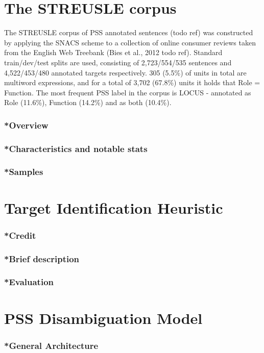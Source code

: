 \section{The STREUSLE corpus}\label{sec:streusle}
The STREUSLE corpus of PSS annotated sentences (todo ref) was constructed by applying the SNACS scheme to a collection of online consumer reviews taken from the English Web Treebank (Bies et al., 2012 todo ref). Standard train/dev/test splits are used, consisting of 2,723/554/535 sentences and 4,522/453/480 annotated targets respectively. 305 (5.5\%) of units in total are multiword expressions, and for a total of 3,702 (67.8\%) units it holds that Role = Function. The most frequent PSS label in the corpus is LOCUS - annotated as Role (11.6\%), Function (14.2\%) and as both (10.4\%). 


\subsubsection{*Overview}
\subsubsection{*Characteristics and notable stats}
\subsubsection{*Samples}

\section{Target Identification Heuristic} \label{sec:ident}
\subsubsection{*Credit}
\subsubsection{*Brief description}
\subsubsection{*Evaluation}

\section{PSS Disambiguation Model} \label{sec:pssdisambg}
\subsubsection{*General Architecture}
